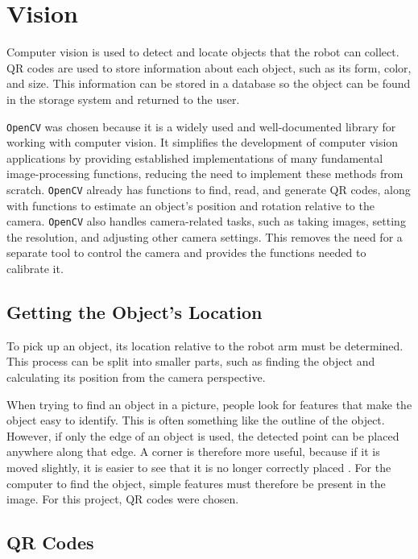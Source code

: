 \section{Vision}
Computer vision is used to detect and locate objects that the robot can collect. QR codes are used to store information about each object, such as its form, color, and size. This information can be stored in a database so the object can be found in the storage system and returned to the user.

\texttt{OpenCV} was chosen because it is a widely used and well-documented library for working with computer vision. It simplifies the development of computer vision applications by providing established implementations of many fundamental image-processing functions, reducing the need to implement these methods from scratch. \texttt{OpenCV} already has functions to find, read, and generate QR codes, along with functions to estimate an object's position and rotation relative to the camera.
\texttt{OpenCV} also handles camera-related tasks, such as taking images, setting the resolution, and adjusting other camera settings. This removes the need for a separate tool to control the camera and provides the functions needed to calibrate it.

\subsection{Getting the Object's Location}
To pick up an object, its location relative to the robot arm must be determined. This process can be split into smaller parts, such as finding the object and calculating its position from the camera perspective.

When trying to find an object in a picture, people look for features that make the object easy to identify. This is often something like the outline of the object. However, if only the edge of an object is used, the detected point can be placed anywhere along that edge. A corner is therefore more useful, because if it is moved slightly, it is easier to see that it is no longer correctly placed \cite{opencv_features}.
For the computer to find the object, simple features must therefore be present in the image. For this project, QR codes were chosen.



\subsection{QR Codes}

